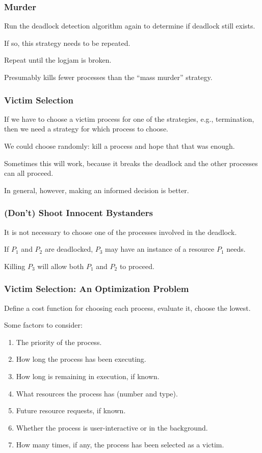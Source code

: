 \begin{frame}
	\frametitle{Murder}
	Run the deadlock detection algorithm again to determine if deadlock still exists.

	If so, this strategy needs to be repeated.

	Repeat until the logjam is broken.

	Presumably kills fewer processes than the ``mass murder'' strategy.

\end{frame}

\begin{frame}
	\frametitle{Victim Selection}

	If we have to choose a victim process for one of the strategies, e.g., termination, then we need a strategy for which process to choose.

	We could choose randomly: kill a process and hope that that was enough.

	Sometimes this will work, because it breaks the deadlock and the other processes can all proceed.

	In general, however, making an informed decision is better.

\end{frame}

\begin{frame}
	\frametitle{(Don't) Shoot Innocent Bystanders}

	It is not necessary to choose one of the processes involved in the deadlock.

	If $P_{1}$ and $P_{2}$ are deadlocked, $P_{3}$  may have an instance of a resource $P_{1}$ needs.

	Killing $P_{3}$ will allow both $P_{1}$ and $P_{2}$ to proceed.

\end{frame}

\begin{frame}
	\frametitle{Victim Selection: An Optimization Problem}

	Define a cost function for choosing each process, evaluate it, choose the lowest.

	Some factors to consider:

	\begin{enumerate}
		\item The priority of the process.
		\item How long the process has been executing.
		\item How long is remaining in execution, if known.
		\item What resources the process has (number and type).
		\item Future resource requests, if known.
		\item Whether the process is user-interactive or in the background.
		\item How many times, if any, the process has been selected as a victim.
	\end{enumerate}

\end{frame}


